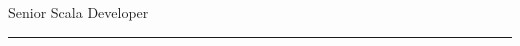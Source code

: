 \documentclass[10pt,a4paper]{article}
\newcommand{\mpwidth}{\linewidth-\fboxsep-\fboxsep}
\begin{document}
  {\begin{minipage}[t][3.5cm][t]{1\mpwidth}
    \raggedright
     \\
    \vspace{-5pt} %
     \\
    \vspace{8pt}
		\large{ Senior Scala Developer}
\end{minipage}} %
\vspace{-12pt}
\par\noindent\textcolor{lightgray}{\rule{\textwidth}{1.0pt}}
\end{document}
